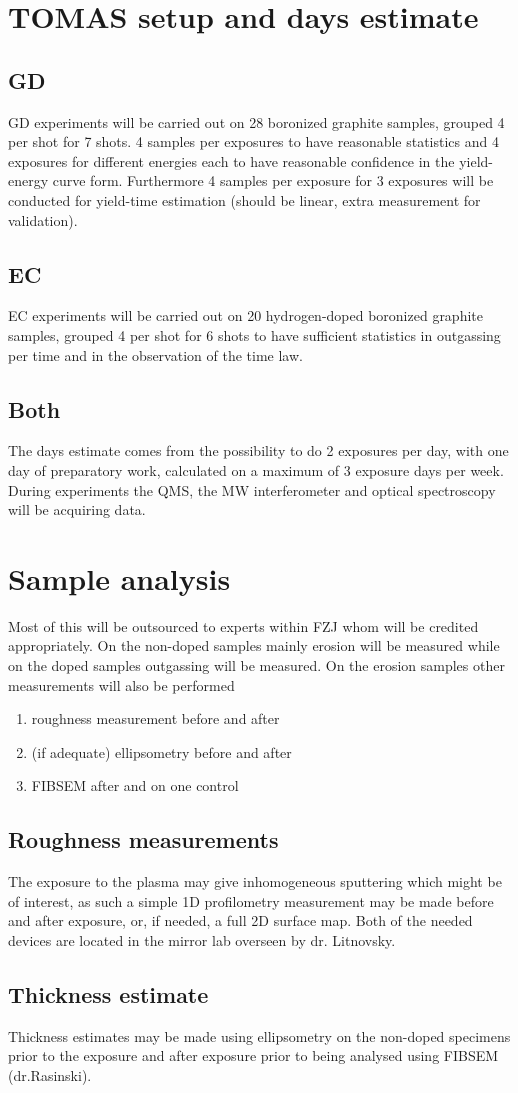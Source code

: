 \documentclass{article}
\begin{document}
\section{TOMAS setup and days estimate}
\subsection*{GD}
GD experiments will be carried out on 28 boronized graphite samples, grouped 4
per shot for 7 shots. 4 samples per exposures to have reasonable statistics and
4 exposures for different energies each to have reasonable confidence in the
yield-energy curve form.  Furthermore 4 samples per exposure for 3 exposures
will be conducted for yield-time estimation (should be linear, extra
measurement for validation).
\subsection*{EC}
EC experiments will be carried out on 20 hydrogen-doped boronized graphite
samples, grouped 4 per shot for 6 shots to have sufficient statistics
in outgassing per time and in the observation of the time law.
\subsection*{Both}
The days estimate comes from the possibility to do 2 exposures per day,
with one day of preparatory work, calculated on a maximum of 3 exposure days per week.
During experiments the QMS, the MW interferometer and optical spectroscopy will
be acquiring data.
\section{Sample analysis}
Most of this will be outsourced to experts within FZJ whom will
be credited appropriately. 
On the non-doped samples mainly erosion will be measured while on the doped samples outgassing
will be measured. On the erosion samples other measurements will also be performed
\begin{enumerate}
    \item roughness measurement before and after
    \item (if adequate) ellipsometry before and after
    \item FIBSEM after and on one control
\end{enumerate}
\subsection{Roughness measurements}
The exposure to the plasma may give inhomogeneous sputtering which might be
of interest, as such a simple 1D profilometry measurement may be made before
and after exposure, or, if needed, a full 2D surface map. Both of the needed
devices are located in the mirror lab overseen by dr. Litnovsky.
\subsection{Thickness estimate}
Thickness estimates may be made using ellipsometry on the non-doped specimens prior
to the exposure and after exposure prior to being analysed using FIBSEM (dr.Rasinski).


\end{document}
